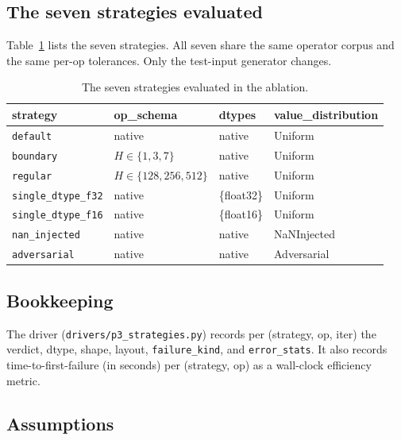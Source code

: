 \documentclass[runningheads]{llncs}
\begin{document}
\subsection{The seven strategies evaluated}
\label{sec:method:seven}

Table~\ref{tab:strategies} lists the seven strategies. All seven share
the same operator corpus and the same per-op tolerances. Only the
test-input generator changes.

\begin{table}[h]
\centering
\caption{The seven strategies evaluated in the ablation.}
\label{tab:strategies}
\begin{tabular}{llll}
\toprule
strategy & op\_schema & dtypes & value\_distribution \\
\midrule
\texttt{default}          & native             & native     & Uniform        \\
\texttt{boundary}         & $H \in \{1,3,7\}$ & native     & Uniform        \\
\texttt{regular}          & $H \in \{128,256,512\}$ & native & Uniform     \\
\texttt{single\_dtype\_f32} & native           & \{float32\} & Uniform       \\
\texttt{single\_dtype\_f16} & native           & \{float16\} & Uniform       \\
\texttt{nan\_injected}    & native             & native     & NaNInjected    \\
\texttt{adversarial}      & native             & native     & Adversarial    \\
\bottomrule
\end{tabular}
\end{table}

\subsection{Bookkeeping}
\label{sec:method:book}

The driver (\texttt{drivers/p3\_strategies.py}) records per (strategy,
op, iter) the verdict, dtype, shape, layout, \texttt{failure\_kind},
and \texttt{error\_stats}. It also records time-to-first-failure (in
seconds) per (strategy, op) as a wall-clock efficiency metric.

\subsection{Assumptions}
\label{sec:method:assumptions}
\end{document}
